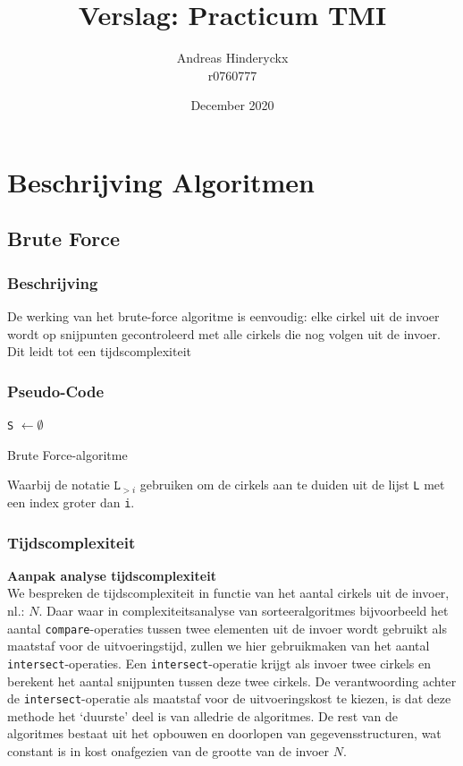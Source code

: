 \documentclass[12pt]{article}
\title{Verslag: Practicum TMI}
\author{Andreas Hinderyckx\\ r0760777}
\date{December 2020}
\begin{document}
\maketitle
\newpage

\section{Beschrijving Algoritmen}
\subsection{Brute Force}

\subsubsection{Beschrijving}
De werking van het brute-force algoritme is eenvoudig: elke cirkel uit de invoer wordt op snijpunten gecontroleerd met alle cirkels die nog volgen uit de invoer. Dit leidt tot een tijdscomplexiteit 

\subsubsection{Pseudo-Code}
\begin{algorithm}[H]
	\texttt{S} $ \leftarrow \emptyset $\\
\caption{Brute Force-algoritme}
\end{algorithm}
Waarbij de notatie $ \texttt{L}_{>i} $ gebruiken om de cirkels aan te duiden uit de lijst \texttt{L} met een index groter dan \texttt{i}.
\subsubsection{Tijdscomplexiteit}
\textbf{Aanpak analyse tijdscomplexiteit}\\
We bespreken de tijdscomplexiteit in functie van het aantal cirkels uit de invoer, nl.: $ N $. Daar waar in complexiteitsanalyse van sorteeralgoritmes bijvoorbeeld het aantal \texttt{compare}-operaties tussen twee elementen uit de invoer wordt gebruikt als maatstaf voor de uitvoeringstijd, zullen we hier gebruikmaken van het aantal \texttt{intersect}-operaties. Een \texttt{intersect}-operatie krijgt als invoer twee cirkels en berekent het aantal snijpunten tussen deze twee cirkels. De verantwoording achter de \texttt{intersect}-operatie als maatstaf voor de uitvoeringskost te kiezen, is dat deze methode het `duurste' deel is van alledrie de algoritmes. De rest van de algoritmes bestaat uit het opbouwen en doorlopen van gegevensstructuren, wat constant is in kost onafgezien van de grootte van de invoer $ N $. 
\end{document}
